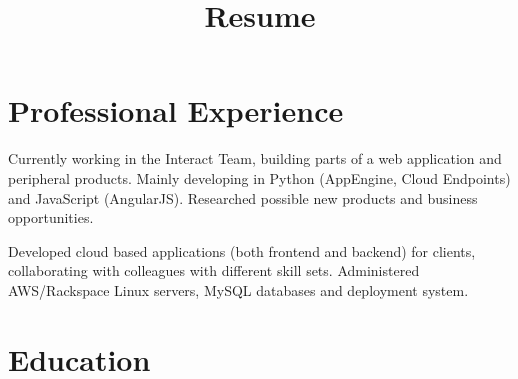 \documentclass[11pt,a4paper,sans]{moderncv} %
\title{Resume}
\begin{document}
\makecvtitle%

\vspace{-1.5cm}


\section{Professional Experience}

{}{Currently working in the Interact Team, building parts of a web application
    and peripheral products. Mainly developing in Python (AppEngine, Cloud
    Endpoints) and JavaScript (AngularJS). Researched possible new products and
    business opportunities.}

{}{Developed cloud based applications (both frontend and backend) for clients,
    collaborating with colleagues with different skill sets. Administered
    AWS/Rackspace Linux servers, MySQL databases and deployment system.}


\section{Education}


\end{document}
